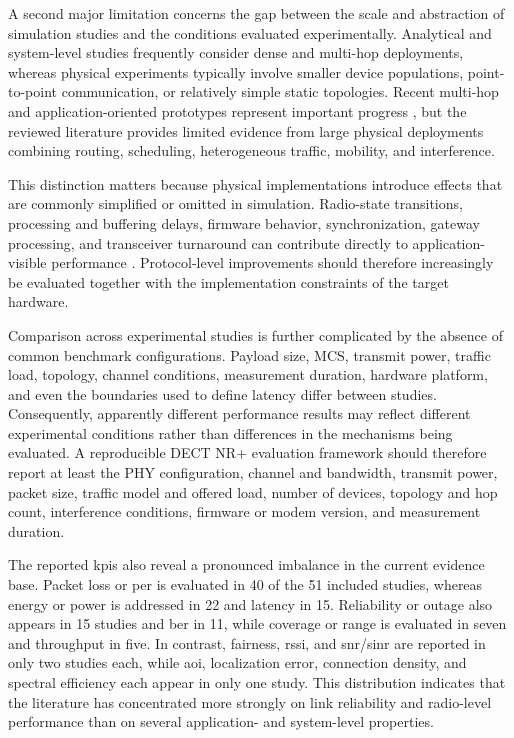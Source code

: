 A second major limitation concerns the gap between the scale and abstraction of
simulation studies and the conditions evaluated experimentally. Analytical and
system-level studies frequently consider dense and multi-hop deployments,
whereas physical experiments typically involve smaller device populations,
point-to-point communication, or relatively simple static topologies. Recent
multi-hop and application-oriented prototypes represent important progress
\cite{piresDECT2020NREnergy2026b,
poetsProfessionalNetworkedAudio2025}, but the reviewed literature provides
limited evidence from large physical deployments combining routing,
scheduling, heterogeneous traffic, mobility, and interference.

This distinction matters because physical implementations introduce effects
that are commonly simplified or omitted in simulation. Radio-state
transitions, processing and buffering delays, firmware behavior,
synchronization, gateway processing, and transceiver turnaround can contribute
directly to application-visible performance
\cite{bandaraExperimentalValidationAnalysis2025,
piresDECT2020NREnergy2026b,
alizaiMeasurementDrivenLatencyAnalysis2026}. Protocol-level improvements
should therefore increasingly be evaluated together with the implementation
constraints of the target hardware.

Comparison across experimental studies is further complicated by the absence
of common benchmark configurations. Payload size, MCS, transmit power, traffic
load, topology, channel conditions, measurement duration, hardware platform,
and even the boundaries used to define latency differ between studies.
Consequently, apparently different performance results may reflect different
experimental conditions rather than differences in the mechanisms being
evaluated. A reproducible DECT NR+ evaluation framework should therefore
report at least the PHY configuration, channel and bandwidth, transmit power,
packet size, traffic model and offered load, number of devices, topology and
hop count, interference conditions, firmware or modem version, and
measurement duration.

The reported \glspl{kpi} also reveal a pronounced imbalance in the current
evidence base. Packet loss or \gls{per} is evaluated in 40 of the 51 included
studies, whereas energy or power is addressed in 22 and latency in 15.
Reliability or outage also appears in 15 studies and \gls{ber} in 11, while
coverage or range is evaluated in seven and throughput in five. In contrast,
fairness, \gls{rssi}, and \gls{snr}/\gls{sinr} are reported in only two
studies each, while \gls{aoi}, localization error, connection density, and
spectral efficiency each appear in only one study. This distribution indicates
that the literature has concentrated more strongly on link reliability and
radio-level performance than on several application- and system-level
properties.

